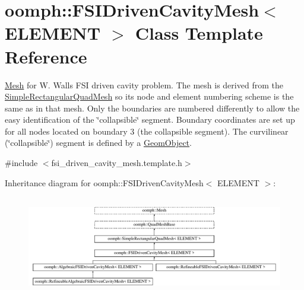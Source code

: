 \hypertarget{classoomph_1_1FSIDrivenCavityMesh}{}\section{oomph\+:\+:F\+S\+I\+Driven\+Cavity\+Mesh$<$ E\+L\+E\+M\+E\+NT $>$ Class Template Reference}
\label{classoomph_1_1FSIDrivenCavityMesh}


\hyperlink{classoomph_1_1Mesh}{Mesh} for W. Wall\textquotesingle{}s F\+SI driven cavity problem. The mesh is derived from the {\ttfamily \hyperlink{classoomph_1_1SimpleRectangularQuadMesh}{Simple\+Rectangular\+Quad\+Mesh}} so it\textquotesingle{}s node and element numbering scheme is the same as in that mesh. Only the boundaries are numbered differently to allow the easy identification of the \char`\"{}collapsible\char`\"{} segment. Boundary coordinates are set up for all nodes located on boundary 3 (the collapsible segment). The curvilinear (\char`\"{}collapsible\char`\"{}) segment is defined by a {\ttfamily \hyperlink{classoomph_1_1GeomObject}{Geom\+Object}}.  




{\ttfamily \#include $<$fsi\+\_\+driven\+\_\+cavity\+\_\+mesh.\+template.\+h$>$}

Inheritance diagram for oomph\+:\+:F\+S\+I\+Driven\+Cavity\+Mesh$<$ E\+L\+E\+M\+E\+NT $>$\+:\begin{figure}[H]
\begin{center}
\leavevmode
\includegraphics[height=4.375000cm]{classoomph_1_1FSIDrivenCavityMesh}
\end{center}
\end{figure}
